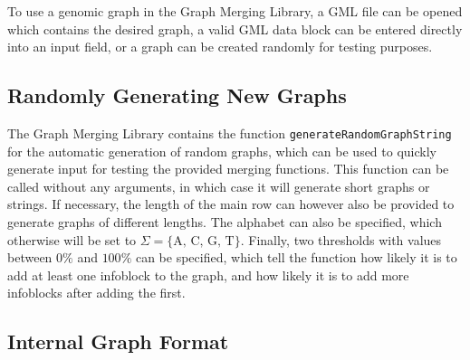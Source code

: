 \documentclass[a4paper,12pt,twoside,BCOR=10mm]{scrbook}
\begin{document}
To use a genomic graph in the Graph Merging Library, 
a GML file can be opened which contains the desired graph, 
a valid GML data block can be entered directly into an input field, 
or a graph can be created randomly for testing purposes.

\subsection{Randomly Generating New Graphs}

The Graph Merging Library contains the function \texttt{generateRandomGraphString} for 
the automatic generation of random graphs, which can be used to quickly generate input for testing the 
provided merging functions. 
This function can be called without any arguments, in which case it will generate short graphs 
or strings. If necessary, the length of the main row can however also be provided to generate 
graphs of different lengths. The alphabet can also be specified, which otherwise will be 
set to $ \Sigma = \{ \textrm{A, C, G, T} \} $. Finally, two thresholds with values between $ 0\% $ and $ 100\% $ can 
be specified, which tell the function how likely it is to add at least one infoblock to the graph, 
and how likely it is to add more infoblocks after adding the first.


\subsection{Internal Graph Format}
\label{sec:internal_graph_format}
\end{document}
